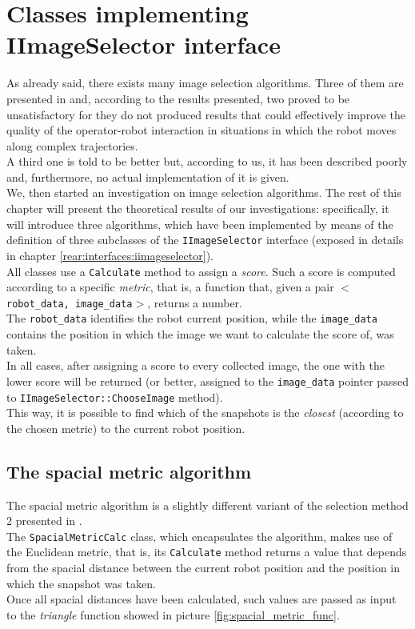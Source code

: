\section{Classes implementing IImageSelector interface}
\label{concr:iimageselector}

As already said, there exists many image selection algorithms. 
Three of them are presented in \cite{sugimoto} and, according 
to the results presented, two proved to be unsatisfactory for 
they do not produced results that could effectively improve 
the quality of the operator-robot interaction in situations 
in which the robot moves along complex trajectories.
\\
A third one is told to be better but, according to us, it has 
been described poorly and, furthermore, no actual implementation 
of it is given.
\\
We, then started an investigation on image selection algorithms.
The rest of this chapter will present the theoretical results 
of our investigations: specifically, it will introduce 
three algorithms, which have been implemented by means of 
the definition of three subclasses of the 
\texttt{IImageSelector} interface (exposed in details
in chapter \ref{rear:interfaces:iimageselector}).
\\
All classes use a \texttt{Calculate} method to assign a 
\textit{score}. Such a score is computed according to 
a specific \textit{metric}, that is, a function that, 
given a pair $<$\texttt{robot\_data, image\_data}$>$, 
returns a number. 
\\
The \texttt{robot\_data} identifies the robot current position, 
while the \texttt{image\_data} contains the position 
in which the image we want to calculate the score of, 
was taken.
\\
In all cases, after assigning a score to every collected image, 
the one with the lower score will be returned 
(or better, assigned to the \texttt{image\_data} pointer 
passed to \texttt{IImageSelector::ChooseImage} method).
\\
This way, it is possible to find which of the snapshots is 
the \textit{closest} (according to the chosen metric) to 
the current robot position.

\subsection{The spacial metric algorithm}
\label{concr:iimageselector:spacial_metric_algorithm}

The spacial metric algorithm is a slightly different variant 
of the selection method 2 presented in \cite{sugimoto}.
\\
The \texttt{SpacialMetricCalc} class, which encapsulates 
the algorithm, makes use of the Euclidean metric, that is,
its \texttt{Calculate} method returns a value that 
depends from the spacial distance between the current 
robot position and the position in which the snapshot 
was taken.
\\
Once all spacial distances have been calculated, such values 
are passed as input to the \textit{triangle} function 
showed in picture \ref{fig:spacial_metric_func}.

